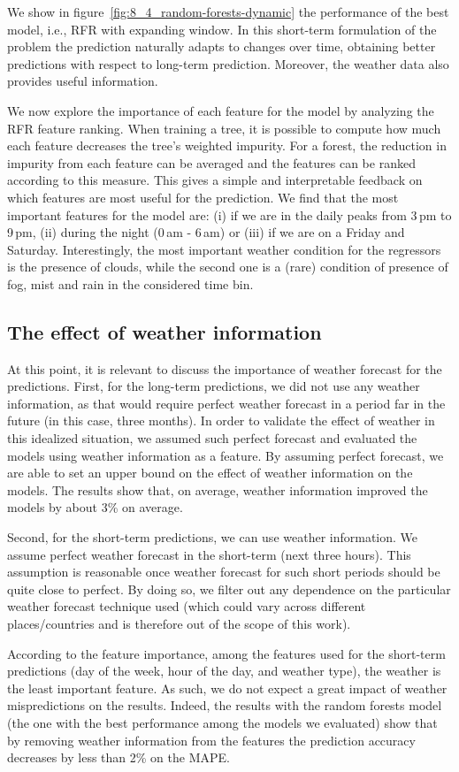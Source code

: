 We show in figure~\ref{fig:8_4_random-forests-dynamic} the performance of the best model, i.e., RFR with expanding window. In this short-term formulation of the problem the prediction naturally adapts to changes over time, obtaining better predictions with respect to long-term prediction. Moreover, the weather data also provides useful information. 



We now explore the importance of each feature for the model by analyzing the RFR feature ranking.  
When training a tree, it is possible to compute how much each feature decreases the tree's weighted impurity. For a forest, the reduction in impurity from each feature can be averaged and the features can be ranked according to this measure. This gives a simple and interpretable feedback on which features are most useful for the prediction. 
We find that the most important features for the model are: (i) if we are in the daily peaks from 3\,pm to 9\,pm, (ii) during the night (0\,am - 6\,am) or (iii) if we are on a Friday and Saturday. Interestingly, the most important weather condition for the regressors is the presence of clouds, while the second one is a (rare) condition of presence of fog, mist and rain in the considered time bin. 

\subsection{The effect of weather information}

At this point, it is relevant to discuss the importance of weather forecast for the predictions.
First, for the long-term predictions, we did not use any weather information, as that would require perfect weather forecast in a period far in the future (in this case, three months). In order to validate the effect of weather in this idealized situation, we assumed such perfect forecast and evaluated the models using weather information as a feature. By assuming perfect forecast, we are able to set an upper bound on the effect of weather information on the models. The results show that, on average, weather information improved the models by about 3\% on average.

Second, for the short-term predictions, we can use weather information. We assume perfect weather forecast in the short-term (next three hours). This assumption is reasonable once weather forecast for such short periods should be quite close to perfect. By doing so, we filter out any dependence on the particular weather forecast technique used (which could vary across different places/countries and is therefore out of the scope of this work). 

According to the feature importance, among the features used for the short-term predictions (day of the week, hour of the day, and weather type), the weather is the least important feature. As such, we do not expect a great impact of weather mispredictions on the results. Indeed, the results with the random forests model (the one with the best performance among the models we evaluated) show that by removing weather information from the features the prediction accuracy decreases  by less than 2\% on the MAPE.

